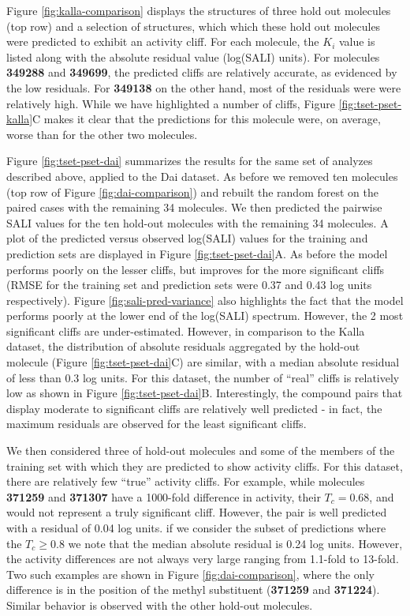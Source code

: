 \documentclass[letterpaper, 12pt]{article}
\begin{document}
Figure \ref{fig:kalla-comparison} displays the structures of three hold out molecules (top row)
and a selection of structures, which which these hold out molecules were predicted to exhibit an
activity cliff. For each molecule, the $K_i$ value is listed along with the absolute residual value
(log(SALI) units). For molecules \textbf{349288} and \textbf{349699}, the predicted cliffs are
relatively accurate, as evidenced by the low residuals. For \textbf{349138} on the other hand, most
of the residuals were were relatively high. While we have highlighted a number of cliffs,
Figure \ref{fig:tset-pset-kalla}C makes it clear that the predictions for this molecule were, on
average, worse than for the other two molecules.

Figure \ref{fig:tset-pset-dai} summarizes the results for the same set of analyzes described above,
applied to the Dai dataset. As before we removed ten molecules (top row of Figure
\ref{fig:dai-comparison}) and rebuilt the random forest on the paired cases with the remaining 34
molecules. We then predicted the pairwise SALI values for the ten hold-out molecules with the
remaining 34 molecules. A plot of the predicted versus observed log(SALI) values for the training
and prediction sets are displayed in Figure \ref{fig:tset-pset-dai}A. As before the model performs
poorly on the lesser cliffs, but improves for the more significant cliffs (RMSE for the training set
and prediction sets were 0.37 and 0.43 log units respectively). Figure \ref{fig:sali-pred-variance}
also highlights the fact that the model performs poorly at the lower end of the log(SALI)
spectrum. However, the 2 most significant cliffs are under-estimated. However, in comparison to the
Kalla dataset, the distribution of absolute residuals aggregated by the hold-out molecule (Figure
\ref{fig:tset-pset-dai}C) are similar, with a median absolute residual of less than 0.3 log units.
For this dataset, the number of ``real'' cliffs is relatively low as shown in Figure
\ref{fig:tset-pset-dai}B. Interestingly, the compound pairs that display moderate to significant
cliffs are relatively well predicted - in fact, the maximum residuals are observed for the least
significant cliffs.

We then considered three of hold-out molecules and some of the members of the training set with
which they are predicted to show activity cliffs. For this dataset, there are relatively few
``true'' activity cliffs. For example, while molecules \textbf{371259} and \textbf{371307} have a
1000-fold difference in activity, their $T_c = 0.68$, and would not represent a truly significant
cliff. However, the pair is well predicted with a residual of 0.04 log units. if we consider the
subset of predictions where the $T_c \geq 0.8$ we note that the median absolute residual is 0.24 log
units. However, the activity differences are not always very large ranging from 1.1-fold to
13-fold. Two such examples are shown in Figure \ref{fig:dai-comparison}, where the only difference
is in the position of the methyl substituent (\textbf{371259} and \textbf{371224}). Similar behavior
is observed with the other hold-out molecules.
\end{document}
